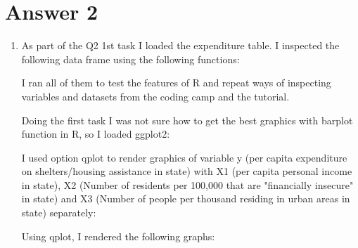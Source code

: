 \documentclass[12pt,letterpaper]{article}
\begin{document}
\section*{Answer 2}

\begin{enumerate}
	\item As part of the Q2 1st task I loaded the expenditure table. I inspected the following data frame using the following functions:
	
	I ran all of them to test the features of R and repeat ways of inspecting variables and datasets from the coding camp and the tutorial. 
	
	Doing the first task I was not sure how to get the best graphics with barplot function in R, so I loaded ggplot2:
	
	I used option qplot to render graphics of variable y (per capita expenditure on shelters/housing assistance in state) with X1 (per capita personal income in state), X2 (Number of residents per 100,000 that are "financially insecure" in state) and X3 (Number of people per thousand residing in urban areas in state) separately: 
	
	Using qplot, I rendered the following graphs:
	

\end{enumerate}
\end{document}

